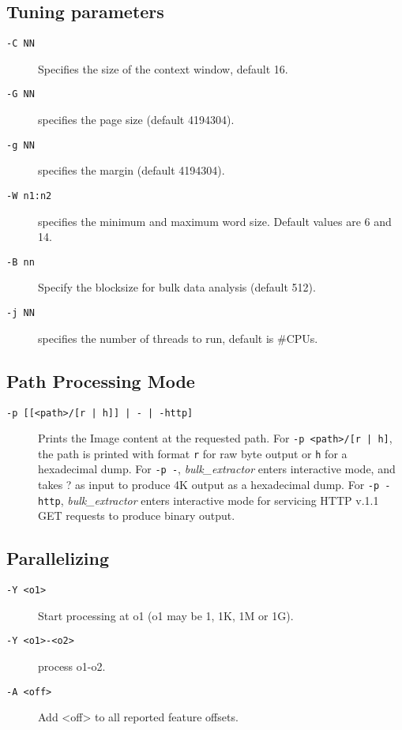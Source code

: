 \documentclass[10pt,twoside]{article}
\newcommand{\bulk}{\emph{bulk\_extractor}\xspace}
\begin{document}
\subsection*{Tuning parameters}
\begin{description}
\item[\texttt{-C NN}] Specifies the size of the context window, default 16.
\item[\texttt{-G NN}] specifies the page size (default 4194304).
\item[\texttt{-g NN}] specifies the margin (default 4194304).
\item[\texttt{-W n1:n2}] specifies the minimum and maximum word size.
Default values are 6 and 14.
\item[\texttt{-B nn}] Specify the blocksize for bulk data analysis (default 512).
\item[\texttt{-j NN}] specifies the number of threads to run, default is \#CPUs.
\end{description}

\subsection*{Path Processing Mode}
\begin{description}
\item[\texttt{-p [[<path>/[r | h]] | - | -http]}] Prints the Image content at the requested path.
For \texttt{\texttt{-p <path>/[r | h]}}, the path is printed
with format \texttt{r} for raw byte output or \texttt{h} for a hexadecimal dump.
For \texttt{-p -}, \bulk enters interactive mode, and takes ? as input to produce 4K output
as a hexadecimal dump.
For \texttt{-p -http}, \bulk enters interactive mode for servicing HTTP v.1.1 GET requests
to produce binary output.
\end{description}

\subsection*{Parallelizing}
\begin{description}
\item[\texttt{-Y <o1>}] Start processing at o1 (o1 may be 1, 1K, 1M or 1G).
\item[\texttt{-Y <o1>-<o2>}] process o1-o2.
\item[\texttt{-A <off>}] Add <off> to all reported feature offsets.
\end{description}
\end{document}
